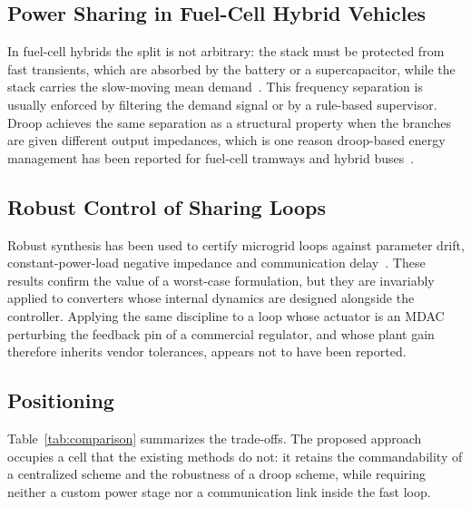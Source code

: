 \subsection{Power Sharing in Fuel-Cell Hybrid Vehicles}

In fuel-cell hybrids the split is not arbitrary: the stack must be protected
from fast transients, which are absorbed by the battery or a supercapacitor,
while the stack carries the slow-moving mean
demand~\cite{thounthong2007control,garcia2016statemachine,li2022dcbusregulation}.
This frequency separation is usually enforced by filtering the demand signal or
by a rule-based supervisor. Droop achieves the same separation as a structural
property when the branches are given different output impedances, which is one
reason droop-based energy management has been reported for fuel-cell
tramways and hybrid buses~\cite{garcia2016statemachine,li2022dcbusregulation}.

\subsection{Robust Control of Sharing Loops}

Robust synthesis has been used to certify microgrid loops against parameter
drift, constant-power-load negative impedance and communication
delay~\cite{sedhom2019hinf,hosseinzadeh2024robust,mirjafari2022robust}. These
results confirm the value of a worst-case formulation, but they are invariably
applied to converters whose internal dynamics are designed alongside the
controller. Applying the same discipline to a loop whose actuator is an MDAC
perturbing the feedback pin of a commercial regulator, and whose plant gain
therefore inherits vendor tolerances, appears not to have been reported.

\subsection{Positioning}

Table~\ref{tab:comparison} summarizes the trade-offs. The proposed approach
occupies a cell that the existing methods do not: it retains the commandability
of a centralized scheme and the robustness of a droop scheme, while requiring
neither a custom power stage nor a communication link inside the fast loop.

